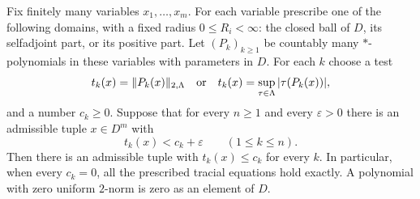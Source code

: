 \begin{lemma}
\label{u:lem:tracial-diagonal}
Fix finitely many variables $x_1,\ldots,x_m$. For each variable
prescribe one of the following domains, with a fixed radius
$0\le R_i<\infty$: the closed ball of $D$, its selfadjoint part, or its positive
part. Let $(P_k)_{k\ge1}$ be countably many $*$-polynomials in these
variables with parameters in $D$. For each $k$ choose a test
\[
 t_k(x)=\lVert P_k(x)\rVert_{2,\Lambda}
 \quad\text{or}\quad
 t_k(x)=\sup_{\tau\in\Lambda}|\tau(P_k(x))|,
\]
and a number $c_k\ge0$.
Suppose that for every $n\ge1$ and every $\varepsilon>0$ there is
an admissible tuple $x\in D^m$ with
\[
 t_k(x)<c_k+\varepsilon\qquad(1\le k\le n).
\]
Then there is an admissible tuple with $t_k(x)\le c_k$ for every
$k$. In particular, when every $c_k=0$, all the prescribed
tracial equations hold exactly. A polynomial with zero uniform
$2$-norm is zero as an element of $D$.
\end{lemma}

